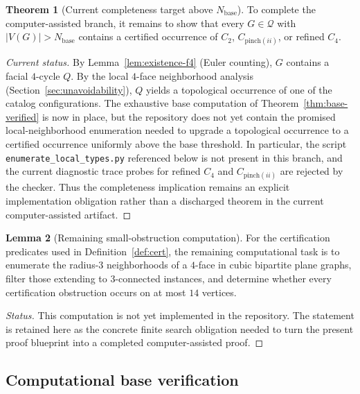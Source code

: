 \documentclass[12pt]{article}
\theoremstyle{definition}
\newtheorem{theorem}{Theorem}
\newtheorem{lemma}[theorem]{Lemma}
\begin{document}
\begin{theorem}[Current completeness target above $N_{\mathrm{base}}$]
\label{thm:certified-completeness-above}
To complete the computer-assisted branch, it remains to show that every $G\in\mathcal Q$ with
$|V(G)|>N_{\mathrm{base}}$ contains a certified occurrence of $C_2$, $C_{\mathrm{pinch}(ii)}$, or refined $C_4$.
\end{theorem}

\begin{proof}[Current status]
By Lemma~\ref{lem:existence-f4} (Euler counting), $G$ contains a facial $4$-cycle $Q$.
By the local $4$-face neighborhood analysis (Section~\ref{sec:unavoidability}),
$Q$ yields a topological occurrence of one of the catalog configurations.
The exhaustive base computation of Theorem~\ref{thm:base-verified} is now in place, but the repository does not yet contain the promised local-neighborhood enumeration needed to upgrade a topological occurrence to a certified occurrence uniformly above the base threshold. In particular, the script \texttt{enumerate\_local\_types.py} referenced below is not present in this branch, and the current diagnostic trace probes for refined $C_4$ and $C_{\mathrm{pinch}(ii)}$ are rejected by the checker. Thus the completeness implication remains an explicit implementation obligation rather than a discharged theorem in the current computer-assisted artifact.
\end{proof}

\begin{lemma}[Remaining small-obstruction computation]
\label{lem:small-obstructions}
For the certification predicates used in Definition~\ref{def:cert}, the remaining computational task is to enumerate the radius-$3$ neighborhoods of a $4$-face in cubic bipartite plane graphs, filter those extending to $3$-connected instances, and determine whether every certification obstruction occurs on at most $14$ vertices.
\end{lemma}
\begin{proof}[Status]
This computation is not yet implemented in the repository. The statement is retained here as the concrete finite search obligation needed to turn the present proof blueprint into a completed computer-assisted proof.
\end{proof}

\subsection{Computational base verification}
\end{document}
